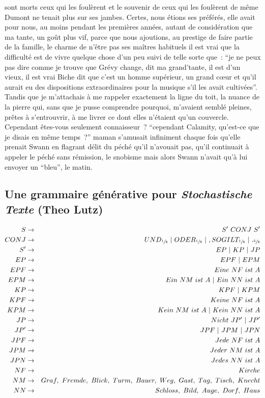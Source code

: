 \documentclass{article}
\begin{document}
sont morts ceux qui les foulèrent et le souvenir de ceux qui les foulèrent de même Dumont ne tenait plus sur ses jambes. Certes, nous étions ses préférés, elle avait pour nous, au moins pendant les premières années, autant de considération que ma tante, un goût plus vif, parce que nous ajoutions, au prestige de faire partie de la famille, le charme de n'être pas ses maîtres habituels il est vrai que la difficulté est de vivre quelque chose d'un peu suivi de telle sorte que~: ``je ne peux pas dire comme je trouve que Grévy change, dit ma grand'tante, il est d'un vieux, il est vrai Biche dit que c'est un homme supérieur, un grand cœur et qu'il aurait eu des dispositions extraordinaires pour la musique s'il les avait cultivées''. Tandis que je m'attachais à me rappeler exactement la ligne du toit, la nuance de la pierre qui, sans que je pusse comprendre pourquoi, m'avaient semblé pleines, prêtes à s'entrouvrir, à me livrer ce dont elles n'étaient qu'un couvercle. Cependant êtes-vous seulement connaisseur~? ``cependant Calamity, qu'est-ce que je disais en même temps~?'' maman s'amusait infiniment chaque fois qu'elle prenait Swann en flagrant délit du péché qu'il n'avouait pas, qu'il continuait à appeler le péché sans rémission, le snobisme mais alors Swann n'avait qu'à lui envoyer un ``bleu'', le matin.
		\subsection{Une grammaire générative pour \textit{Stochastische Texte} (Theo Lutz)}\label{lutz_grammar}
			\begin{eqnarray*}
				S &\rightarrow& S' \ CONJ \ S'\\
				CONJ &\rightarrow& UND_{\sfrac{1}{8}} \ | \ ODER_{\sfrac{1}{8}} \ | \ , SO GILT_{\sfrac{1}{8}} \ | \ ._{\sfrac{5}{8}} \\
				S' &\rightarrow& EP\ | \ KP \ |\ JP\\
				EP & \rightarrow& EPF \ | \ EPM\\
				EPF & \rightarrow& Eine \ NF \ ist \ A\\
				EPM & \rightarrow& Ein \ NM \ ist \ A \ | \ Ein \ NN \ ist \ A\\
				KP & \rightarrow& KPF \ | \ KPM\\
				KPF & \rightarrow& Keine \ NF \ ist \ A\\
				KPM & \rightarrow& Kein \ NM \ ist \ A \ | \ Kein \ NN \ ist \ A\\
				JP & \rightarrow& Nicht \ JP' \ | \ JP'\\
				JP' & \rightarrow& JPF \ | \ JPM \ | \ JPN\\
				JPF & \rightarrow& Jede \ NF \ ist \ A\\
				JPM & \rightarrow& Jeder \ NM \ ist \ A\\
				JPN & \rightarrow& Jedes \ NN \ ist \ A\\
				NF & \rightarrow& Kirche\\
				NM & \rightarrow& Graf, \ Fremde, \ Blick, \ Turm, \ Bauer, \ Weg, \ Gast, \ Tag, \ Tisch, \ Knecht\\
				NN &\rightarrow& Schloss, \ Bild, \ Auge, \ Dorf, \ Haus\\
			\end{eqnarray*}
\end{document}
